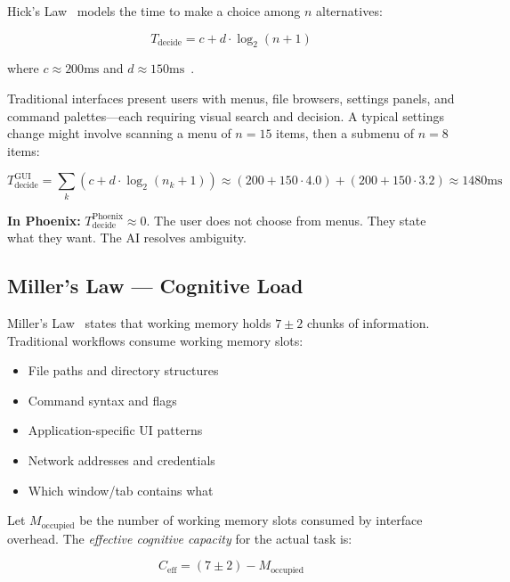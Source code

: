 \documentclass[11pt, a4paper]{article}
\begin{document}
Hick's Law~\cite{hick1952} models the time to make a choice among $n$
alternatives:

\begin{equation}
  T_{\text{decide}} = c + d \cdot \log_2(n + 1)
  \label{eq:hick}
\end{equation}

where $c \approx 200\text{ms}$ and $d \approx 150\text{ms}$~\cite{seow2005}.

Traditional interfaces present users with menus, file browsers, settings panels,
and command palettes---each requiring visual search and decision. A typical
settings change might involve scanning a menu of $n = 15$ items, then a submenu
of $n = 8$ items:

\begin{equation}
  T_{\text{decide}}^{\text{GUI}} = \sum_{k} \left(c + d \cdot \log_2(n_k + 1)\right)
  \approx (200 + 150 \cdot 4.0) + (200 + 150 \cdot 3.2) \approx 1480\text{ms}
\end{equation}

\textbf{In Phoenix:} $T_{\text{decide}}^{\text{Phoenix}} \approx 0$. The user does not
choose from menus. They state what they want. The AI resolves ambiguity.

\subsection{Miller's Law --- Cognitive Load}

Miller's Law~\cite{miller1956} states that working memory holds $7 \pm 2$ chunks
of information. Traditional workflows consume working memory slots:

\begin{itemize}[noitemsep]
  \item File paths and directory structures
  \item Command syntax and flags
  \item Application-specific UI patterns
  \item Network addresses and credentials
  \item Which window/tab contains what
\end{itemize}

Let $M_{\text{occupied}}$ be the number of working memory slots consumed by
interface overhead. The \emph{effective cognitive capacity} for the actual task
is:

\begin{equation}
  C_{\text{eff}} = (7 \pm 2) - M_{\text{occupied}}
  \label{eq:miller}
\end{equation}
\end{document}
